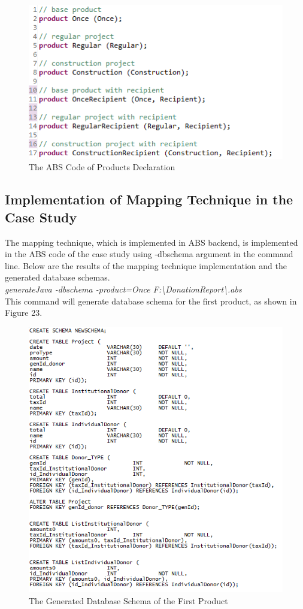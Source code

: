 \documentclass[runningheads,a4paper]{llncs}
\begin{document}
\begin{figure}
	\centering
	\includegraphics[scale=0.7]{code8.png}
	\caption{The ABS Code of Products Declaration}
	\label{Figure 22}
\end{figure}


\subsection{Implementation of Mapping Technique in the Case Study}
The mapping technique, which is implemented in ABS backend, is implemented in the ABS code of the case study using -dbschema argument in the command line. Below are the results of the mapping technique implementation and the generated database schemas.\\

\emph{generateJava -dbschema -product=Once F:\textbackslash DonationReport\textbackslash *.abs}\\

This command will generate database schema for the first product, as shown in Figure 23.\\

\begin{figure}
	\centering
	\includegraphics[scale=0.7]{create1.png}
	\caption{The Generated Database Schema of the First Product}
	\label{Figure 23}
\end{figure}
\end{document}
